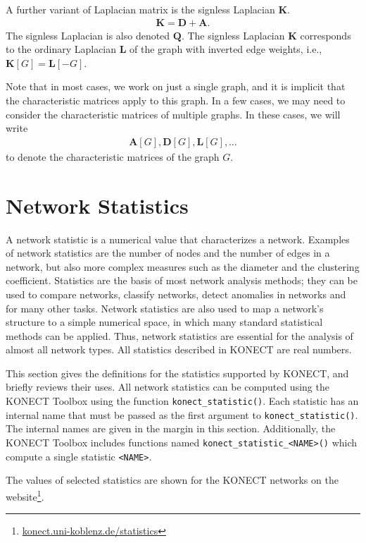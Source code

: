 \documentclass{article}
\begin{document}
A further variant of Laplacian matrix is the signless Laplacian $\mathbf
K$. 
\begin{align}
  \mathbf K = \mathbf D + \mathbf A. 
\end{align}
The signless Laplacian is also denoted $\mathbf Q$. 
The signless Laplacian $\mathbf K$ corresponds to the ordinary Laplacian
$\mathbf L$ of the graph with inverted edge weights, i.e., $\mathbf K[G] =
\mathbf L[-G]$. 

Note that in most cases, we work on just a single graph, and it is
implicit that the characteristic matrices apply to this graph.  In a few
cases, we may need to consider the characteristic matrices of multiple
graphs.  In these cases, we will write
\begin{align*}
  \mathbf A[G], \mathbf D[G], \mathbf L[G], \dotsc
\end{align*}
to denote the characteristic matrices of the graph $G$. 

\section{Network Statistics}
\label{sec:statistics}
A network statistic is a numerical value that characterizes a network.
Examples of network statistics are the number of nodes and the number of
edges in a network, but also more complex measures such as the diameter and the
clustering coefficient.  
Statistics are the basis of most network analysis methods; they can be
used to compare networks, classify networks, detect anomalies in
networks and for many other tasks.  Network statistics are also used to map a network's structure
to a simple numerical space, in which many standard statistical
methods can be applied.  Thus, network statistics are essential for the
analysis of almost all network types. 
All statistics described in KONECT are real numbers.  

This section gives the definitions for the statistics supported by
KONECT, and briefly reviews their uses.  
All network statistics can be computed using the KONECT Toolbox using
the function \texttt{konect\_statistic()}. Each statistic has an
internal name that must be passed as the first argument to
\texttt{konect\_statistic()}.  The internal names are given in the
margin in this section. 
Additionally, the KONECT Toolbox includes functions named
\texttt{konect\_statistic\_<NAME>()} which compute a single statistic
\texttt{<NAME>}. 

The values of selected statistics are
shown for the KONECT networks on the
website\footnote{\href{http://konect.uni-koblenz.de/statistics/}{konect.uni-koblenz.de/statistics}}.  
\end{document}
